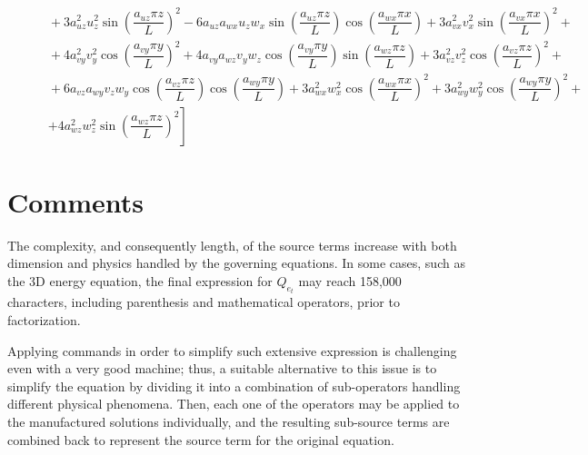 \documentclass[10pt]{article}
\begin{document}
\begin{equation}
\begin{split}
    &\qquad+3 a_{uz}^2 u_z^2 \sin\left(\dfrac{a_{uz} \pi z}{L}\right)^2-6 a_{uz} a_{wx} u_z w_x \sin\left(\dfrac{a_{uz} \pi z}{L}\right) \cos\left(\dfrac{a_{wx} \pi x}{L}\right)+3 a_{vx}^2 v_x^2 \sin\left(\dfrac{a_{vx} \pi x}{L}\right)^2+\\
    &\qquad+4 a_{vy}^2 v_y^2 \cos\left(\dfrac{a_{vy} \pi y}{L}\right)^2+4 a_{vy} a_{wz} v_y w_z \cos\left(\dfrac{a_{vy} \pi y}{L}\right) \sin\left(\dfrac{a_{wz} \pi z}{L}\right)+3 a_{vz}^2 v_z^2 \cos\left(\dfrac{a_{vz} \pi z}{L}\right)^2+\\
    &\qquad+6 a_{vz} a_{wy} v_z w_y \cos\left(\dfrac{a_{vz} \pi z}{L}\right) \cos\left(\dfrac{a_{wy} \pi y}{L}\right)+3 a_{wx}^2 w_x^2 \cos\left(\dfrac{a_{wx} \pi x}{L}\right)^2+3 a_{wy}^2 w_y^2 \cos\left(\dfrac{a_{wy} \pi y}{L}\right)^2+\\
    &\qquad\left.+4 a_{wz}^2 w_z^2 \sin\left(\dfrac{a_{wz} \pi z}{L}\right)^2\right]
\end{split}
\end{equation}



\section{Comments}
The complexity, and consequently length, of the source terms increase with both dimension and physics handled by the governing equations. In some cases, such as the 3D energy equation, the final expression for $Q_{e_t}$ may reach 158,000 characters, including parenthesis and mathematical operators, prior to factorization.

Applying commands in order to simplify such extensive expression is challenging even with a very good machine; thus, a suitable alternative to this issue is to simplify the equation by dividing it into a combination of sub-operators handling different physical phenomena. Then, each one of the operators may be applied to the manufactured solutions individually, and the resulting sub-source terms are combined back to represent the source term for the original equation.
\end{document}
